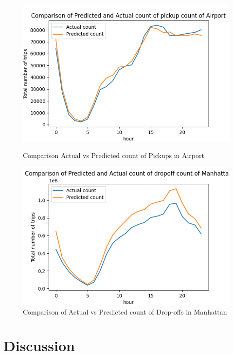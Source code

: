 \documentclass[11pt]{article}
\begin{document}
\begin{figure}[h]
   \begin{minipage}{0.45\textwidth}
     \centering
     \includegraphics[width=\linewidth]{rfr_prediction_pickup_Airport.png}
     \caption{Comparison Actual vs Predicted count of Pickups in Airport}\label{Fig:rfr_pickup_airport}
   \end{minipage}\hfill
   \begin{minipage}{0.45\textwidth}
     \centering
     \includegraphics[width=\linewidth]{rfr_prediction_dropoff_Manhattan.png}
     \caption{Comparison of Actual vs Predicted count of Drop-offs in Manhattan}\label{Fig:rfr_dropoff_manhattan}
   \end{minipage}
\end{figure}

\section{Discussion}
\end{document}
